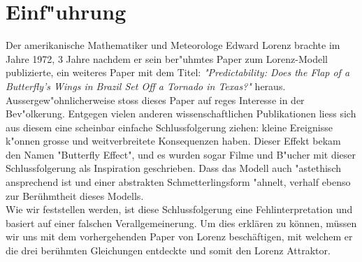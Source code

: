 \documentclass[intro.tex]{subfiles}
\begin{document}
	\section{Einf"uhrung}
	Der amerikanische Mathematiker und Meteorologe Edward Lorenz brachte im Jahre 1972, 3 Jahre nachdem er sein ber"uhmtes Paper zum Lorenz-Modell publizierte, ein weiteres Paper mit dem Titel: \textit{"Predictability: Does the Flap of a Butterfly’s Wings in Brazil Set Off a Tornado in Texas?"} heraus. Aussergew"ohnlicherweise stoss dieses Paper auf reges Interesse in der Bev"olkerung. Entgegen vielen anderen wissenschaftlichen Publikationen liess sich aus diesem eine scheinbar einfache Schlussfolgerung ziehen: kleine Ereignisse k"onnen grosse und weitverbreitete Konsequenzen haben. Dieser Effekt bekam den Namen "Butterfly Effect", und es wurden sogar Filme und B"ucher mit dieser Schlussfolgerung als Inspiration geschrieben. Dass das Modell auch "astethisch ansprechend ist und einer abstrakten Schmetterlingsform "ahnelt, verhalf ebenso zur Berühmtheit dieses Modells. \\
	Wie wir feststellen werden, ist diese Schlussfolgerung eine Fehlinterpretation und basiert auf einer falschen Verallgemeinerung. Um dies erklären zu können, müssen wir uns mit dem vorhergehenden Paper von Lorenz beschäftigen, mit welchem er die drei berühmten Gleichungen entdeckte und somit den Lorenz Attraktor.
\end{document}
